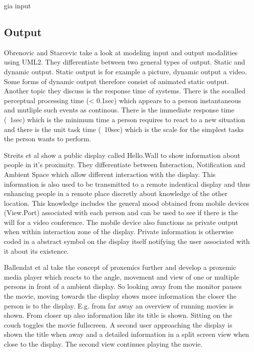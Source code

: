 gia input

\subsection{Output}
Obrenovic and Starcevic \cite{obrenovic_modeling_2004} take a look at modeling input and output modalities using UML2. They differentiate between two general types of output. Static and dynamic output. Static output is for example a picture, dynamic output a video. Some forms of dynamic output therefore consist of animated static output. Another topic they discuss is the response time of systems. There is the socalled perceptual processing time (< 0.1sec) which appears to a person instantaneous and mutliple such events as continous. There is the immediate response time (~1sec) which is the minimum time a person requires to react to a new situation and there is the unit task time (~10sec) which is the scale for the simplest tasks the person wants to perform.


Streits et al \cite{streitz_ambient_2003} show a public display called Hello.Wall to show information about people in it’s proximity. They differentiate between Interaction, Notification and Ambient Space which allow different interaction with the display. This information is also used to be transmitted to a remote indentical display and thus enhancing people in a remote place discretly about knowledge of the other location. This knowledge includes the general mood obtained from mobile devices (View.Port) associated with each person and can be used to see if there is the will for a video conference. The mobile device also functions as private output when within interaction zone of the display. Private information is otherwise coded in a abstract symbol on the display itself notifying the user associated with it about its existence.


Ballendat et al \cite{ballendat_proxemic_2010} take the concept of proxemics further and develop a proxemic media player which reacts to the angle, movement and view of one or multiple persons in front of a ambient display.
So looking away from the monitor pauses the movie, moving towards the display shows more information the closer the person is to the display. E.g. from far away an overview of running movies is shown. From closer up also information like its title is shown. Sitting on the couch toggles the movie fullscreen. A second user approaching the display is shown the title when away and a detailed information in a split screen view when close to the display. The second view continues playing the movie.



